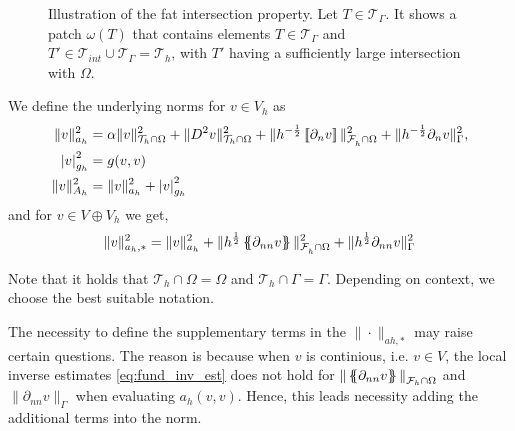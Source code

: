 \begin{figure}[t]
\begin{tikzpicture}
    \end{tikzpicture}
\caption{Illustration of the fat intersection property. Let $T \in \mathcal{T}_{\Gamma } $. It shows a patch $\omega ( T) $ that contains elements $T \in  \mathcal{T}_{\Gamma } $ and $T'\in \mathcal{T} _{int} \cup \mathcal{T} _{\Gamma } = \mathcal{T} _{h}$, with $T' $ having a sufficiently large intersection with $\Omega$.}
    \label{fig:fat_intersection_property}
\end{figure}


We define the underlying norms for $ v \in V_{h} $ as
    \begin{align}
        \label{eq:bi_ah_norm}
        \| v \|_{ a_{h} }^{ 2 } & =    \alpha \|   v \|_{ \mathcal{T} _{h} \cap \Omega  }^{ 2}  + \| D^2 v \|_{\mathcal{T} _{h} \cap \Omega   }^{ 2 } +  \| h^{-\frac{1}{2}} \jump{ \partial _{n} v }   \|_{ \mathcal{F}_{h}^{}\cap \Omega    }^{ 2
        } +  \| h^{-\frac{1}{2}}  \partial _{n} v    \|_{ \Gamma   }^{ 2 },    \\
        \label{eq:bi_gh_norm}
\abs{ v } _{g_{h}}^{2} & = g( v,v) \\
        \label{eq:bi_Ah_norm}
\| v \|_{A_{h}  }^{  2}  & = \| v \|_{ a_{h} }^{ 2 } + \abs{ v } _{g_{h}}^{2} \\
    \end{align}
and for $v \in V \oplus V_{h}$ we get,
\begin{equation}
    \label{eq:astarnorm}
\| v \|_{ a_{h}, * }^{  2}  =\| v \|_{ a_{h} }^{ 2 } +  \| h^{\frac{1}{2}} \mean{ \partial _{nn} v }   \|_{\mathcal{F} _{h}^{} \cap \Omega   }^{  2} +  \| h^{\frac{1}{2}} \partial _{nn} v    \|_{ \Gamma }^{  2}
\end{equation}
\begin{remark}
Note that it holds that $\mathcal{T} _{h} \cap  \Omega   = \Omega  $ and $\mathcal{T} _{h} \cap  \Gamma  = \Gamma $. Depending on context, we choose the best suitable notation.
\end{remark}
\begin{remark}
    The necessity to define the supplementary terms in the $\| \cdot   \|_{a{h},* }^{ } $  may raise certain questions.  The reason is because when $v$ is continious, i.e. $v \in V$, the local inverse estimates  \ref{eq:fund_inv_est} does not hold for $\| \mean{ \partial
    _{nn} v }  \|_{ \mathcal{F}_{h} \cap \Omega    }^{  }  $ and  $\|  \partial
    _{nn} v   \|_{ \Gamma }^{  }  $ when evaluating $a_{h}( v, v) $. Hence, this leads necessity adding the additional terms into the norm.
\end{remark}


